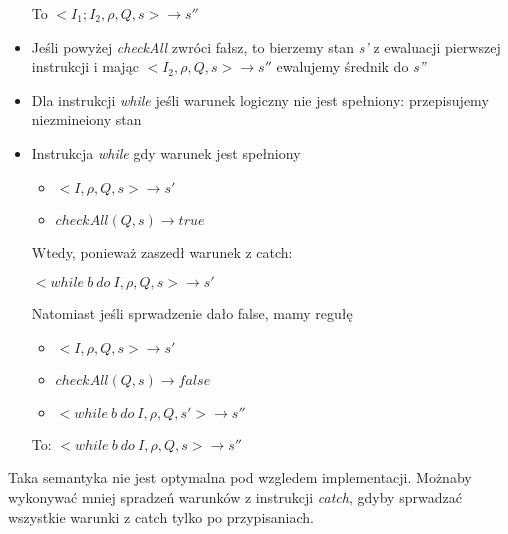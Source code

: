 \documentclass[11pt]{article}
\begin{document}
\begin{itemize}
To $<I_{1};I_{2}, \rho, Q, s> \longrightarrow s''$

\item Jeśli powyżej \textit{checkAll} zwróci fałsz, to bierzemy stan \textit{s'} z ewaluacji pierwszej instrukcji i mając $<I_{2}, \rho, Q, s> \rightarrow s''$
ewalujemy średnik do \textit{s''}

\item Dla instrukcji \textit{while} jeśli warunek logiczny nie jest spełniony: przepisujemy niezmineiony stan

\item Instrukcja \textit{while} gdy warunek jest spełniony
\begin{itemize}
\item $<I, \rho, Q, s> \longrightarrow s'$
\item $checkAll(Q, s) \longrightarrow true$
\end{itemize}

Wtedy, ponieważ zaszedł warunek z catch:

$<while \ b \  do \ I, \rho, Q, s> \longrightarrow s'$

Natomiast jeśli sprwadzenie dało false, mamy regułę

\begin{itemize}
\item $<I, \rho, Q, s> \longrightarrow s'$
\item $checkAll(Q, s) \longrightarrow false$
\item $<while \ b \  do \ I, \rho, Q, s'> \longrightarrow s''$
\end{itemize}

To: $<while \ b \  do \ I, \rho, Q, s> \longrightarrow s''$

\end{itemize}

Taka semantyka nie jest optymalna pod wzgledem implementacji. Możnaby wykonywać mniej spradzeń warunków z instrukcji \textit{catch}, gdyby sprwadzać wszystkie warunki z catch tylko po przypisaniach.
\end{document}
